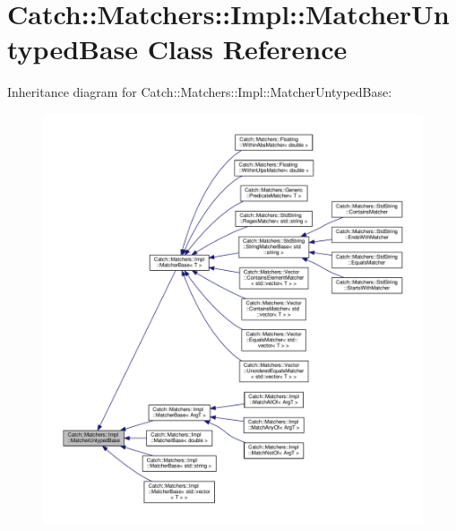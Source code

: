 \hypertarget{classCatch_1_1Matchers_1_1Impl_1_1MatcherUntypedBase}{}\section{Catch\+::Matchers\+::Impl\+::Matcher\+Untyped\+Base Class Reference}
\label{classCatch_1_1Matchers_1_1Impl_1_1MatcherUntypedBase}


Inheritance diagram for Catch\+::Matchers\+::Impl\+::Matcher\+Untyped\+Base\+:\nopagebreak
\begin{figure}[H]
\begin{center}
\leavevmode
\includegraphics[width=350pt]{classCatch_1_1Matchers_1_1Impl_1_1MatcherUntypedBase__inherit__graph}
\end{center}
\end{figure}
